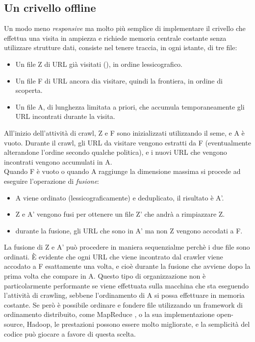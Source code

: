 \subsection{Un crivello offline}
Un modo meno \textit{responsive} ma molto più semplice di implementare il crivello che effettua una visita in ampiezza e richiede memoria centrale costante senza utilizzare strutture dati, consiste nel tenere traccia, in ogni istante, di tre file:
\begin{itemize}
    \item Un file Z di URL già visitati (), in ordine lessicografico.
    \item Un file F di URL ancora dia visitare, quindi la frontiera, in ordine di scoperta.
    \item Un file A, di lunghezza limitata a priori, che accumula temporaneamente gli URL incontrati durante la visita.
\end{itemize}
All'inizio dell'attività di crawl, Z e F sono inizializzati utilizzando il seme, e A è vuoto. Durante il crawl, gli URL da visitare vengono estratti da F (eventualmente alterandone l'ordine secondo qualche politica), e i nuovi URL che vengono incontrati vengono accumulati in A.\\
Quando F è vuoto o quando A raggiunge la dimensione massima si procede ad eseguire l'operazione di \textit{fusione}:
\begin{itemize}
    \item A viene ordinato (lessicograficamente) e deduplicato, il risultato è A'.
    \item Z e A' vengono fusi per ottenere un file Z' che andrà a rimpiazzare Z.
    \item durante la fusione, gli URL che sono in A' ma non Z vengono accodati a F.
\end{itemize}
La fusione di Z e A' può procedere in maniera sequenzialme perchè i due file sono ordinati. È evidente che ogni URL che viene incontrato dal crawler viene accodato a F esattamente una volta, e cioè durante la fusione che avviene dopo la prima volta che compare in A.
Questo tipo di organizzazione non è particolarmente performante se viene effettuata sulla macchina che sta eseguendo l'attività di crawling, sebbene l'ordinamento di A si possa effettuare in memoria costante. Se però è possibile ordinare e fondere file utilizzando un framework di ordinamento distribuito, come MapReduce \cite{MapReduce}, o la sua implementazione open-source, Hadoop, le prestazioni possono essere molto migliorate, e la semplicità del codice può giocare a favore di questa scelta.\\
